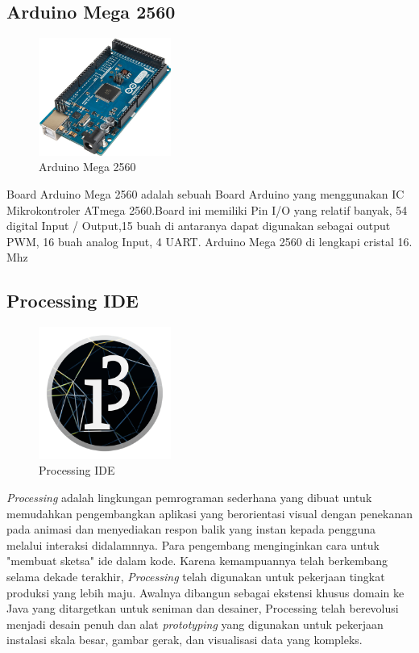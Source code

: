    \subsection{Arduino Mega 2560}
   \begin{figure}[H]
   	\centering
   	\includegraphics[width=4.33cm]{gambar/arduino_mega.png}
   	\caption{ Arduino Mega 2560}
   \end{figure}
   
  Board Arduino Mega 2560 adalah sebuah Board Arduino yang menggunakan IC Mikrokontroler ATmega 2560.Board ini memiliki Pin I/O yang relatif banyak, 54 digital Input / Output,15 buah di antaranya dapat digunakan sebagai output PWM, 16 buah analog Input, 4 UART. Arduino Mega 2560 di lengkapi cristal 16. Mhz 
  	
  
   \subsection{Processing IDE}
  \begin{figure}[H]
  	\centering
  	\includegraphics[width=4.33cm]{logo_processing.png}
  	\caption{Processing IDE}
  \end{figure}
  \emph{Processing} adalah lingkungan pemrograman sederhana yang dibuat untuk  memudahkan pengembangkan aplikasi yang berorientasi visual dengan penekanan pada animasi dan menyediakan respon balik yang instan kepada pengguna melalui interaksi didalamnnya. Para pengembang menginginkan cara untuk "membuat sketsa" ide dalam kode. Karena kemampuannya telah berkembang selama dekade terakhir, \emph{Processing} telah digunakan untuk pekerjaan tingkat produksi yang lebih maju. Awalnya dibangun sebagai ekstensi khusus domain ke Java yang ditargetkan untuk seniman dan desainer, Processing telah berevolusi menjadi desain penuh dan alat \emph{prototyping} yang digunakan untuk pekerjaan instalasi skala besar, gambar gerak, dan visualisasi data yang kompleks.
   

  
  

